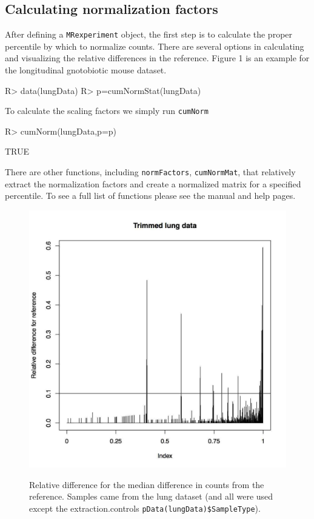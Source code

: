 \documentclass[a4paper,12pt]{article}
\begin{document}
\subsection{Calculating normalization factors}
After defining a \texttt{MRexperiment} object, the first step is to calculate the proper percentile by which to normalize counts. There are several options in calculating and visualizing the relative differences in the reference. Figure 1 is an example for the longitudinal gnotobiotic mouse dataset.
\begin{small}
\begin{Schunk}
\begin{Sinput}
R> data(lungData)
R> p=cumNormStat(lungData)
\end{Sinput}
\end{Schunk}
\end{small}
To calculate the scaling factors we simply run \texttt{cumNorm}
\begin{small}
\begin{Schunk}
\begin{Sinput}
R> cumNorm(lungData,p=p)
\end{Sinput}
\begin{Soutput}
[1] TRUE
\end{Soutput}
\end{Schunk}
\end{small}

There are other functions, including \texttt{normFactors}, \texttt{cumNormMat}, that relatively extract the normalization factors and create a normalized matrix for a specified percentile. To see a full list of functions please see the manual and help pages. 

\begin{figure}
\centerline{\includegraphics[width=.55\textwidth]{metagenomeSeq_figure1.png}\label{fig1}}
\caption{Relative difference for the median difference in counts from the reference. Samples came from the lung dataset (and all were used except the extraction.controls \texttt{pData(lungData)\$SampleType}). }
\end{figure}
\end{document}
